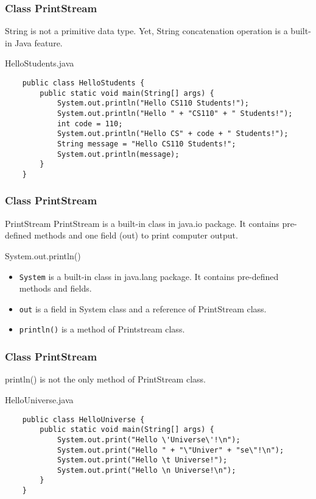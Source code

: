 \documentclass[10pt, compress]{beamer}
\begin{document}
\begin{frame}[fragile]
	\frametitle{Class PrintStream}
	String is not a primitive data type. Yet, String concatenation operation is a built-in Java feature.
	\begin{block}{HelloStudents.java}
	\begin{verbatim}
	public class HelloStudents {
	    public static void main(String[] args) {
	        System.out.println("Hello CS110 Students!");
	        System.out.println("Hello " + "CS110" + " Students!");
	        int code = 110;
	        System.out.println("Hello CS" + code + " Students!");
	        String message = "Hello CS110 Students!";
	        System.out.println(message);
	    }
	}
	\end{verbatim}
	\end{block}
\end{frame}

\begin{frame}[fragile]
	\frametitle{Class PrintStream}
	\begin{block}{PrintStream}
		PrintStream is a built-in class in java.io package. It contains pre-defined methods and one field (out) to print computer output.
	\end{block}
	\begin{block}{System.out.println()}
		\begin{itemize}
			\item[] \texttt{System} is a built-in class in java.lang package. It contains pre-defined methods and fields.
			\item[] \texttt{out} is a field in System class and a reference of PrintStream class.
			\item[] \texttt{println()} is a method of Printstream class.
		\end{itemize}
	\end{block}
\end{frame}

\begin{frame}[fragile]
	\frametitle{Class PrintStream}
	println() is not the only method of PrintStream class.
	\begin{block}{HelloUniverse.java}
	\begin{verbatim}
	public class HelloUniverse {
	    public static void main(String[] args) {
	        System.out.print("Hello \'Universe\'!\n");
	        System.out.print("Hello " + "\"Univer" + "se\"!\n");
	        System.out.print("Hello \t Universe!");
	        System.out.print("Hello \n Universe!\n");
	    }
	}
	\end{verbatim}
	\end{block}
\end{frame}
\end{document}
